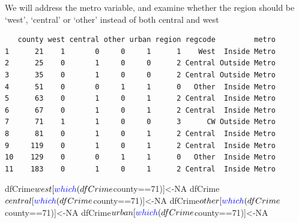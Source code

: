 \documentclass[]{article}
\newenvironment{Shaded}{}{}
\newcommand{\CommentTok}[1]{\textcolor[rgb]{0.00,0.50,0.00}{#1}}
\newcommand{\DecValTok}[1]{#1}
\newcommand{\FloatTok}[1]{#1}
\newcommand{\KeywordTok}[1]{\textcolor[rgb]{0.00,0.00,1.00}{#1}}
\newcommand{\NormalTok}[1]{#1}
\newcommand{\OperatorTok}[1]{#1}
\newcommand{\OtherTok}[1]{\textcolor[rgb]{1.00,0.25,0.00}{#1}}
\newcommand{\StringTok}[1]{\textcolor[rgb]{0.00,0.50,0.50}{#1}}
\begin{document}
We will address the metro variable, and examine whether the region
should be `west', `central' or `other' instead of both central and west

\begin{Shaded}
\end{Shaded}

\begin{verbatim}
   county west central other urban region regcode         metro
1      21    1       0     0     1      1    West  Inside Metro
2      25    0       1     0     0      2 Central Outside Metro
3      35    0       1     0     0      2 Central Outside Metro
4      51    0       0     1     1      0   Other  Inside Metro
5      63    0       1     0     1      2 Central  Inside Metro
6      67    0       1     0     1      2 Central  Inside Metro
7      71    1       1     0     0      3      CW Outside Metro
8      81    0       1     0     1      2 Central  Inside Metro
9     119    0       1     0     1      2 Central  Inside Metro
10    129    0       0     1     1      0   Other  Inside Metro
11    183    0       1     0     1      2 Central  Inside Metro
\end{verbatim}

\begin{Shaded}
\begin{Highlighting}[]
\NormalTok{dfCrime}\OperatorTok{$}\NormalTok{west[}\KeywordTok{which}\NormalTok{(dfCrime}\OperatorTok{$}\NormalTok{county}\OperatorTok{==}\DecValTok{71}\NormalTok{)]<-}\OtherTok{NA}
\NormalTok{dfCrime}\OperatorTok{$}\NormalTok{central[}\KeywordTok{which}\NormalTok{(dfCrime}\OperatorTok{$}\NormalTok{county}\OperatorTok{==}\DecValTok{71}\NormalTok{)]<-}\OtherTok{NA}
\NormalTok{dfCrime}\OperatorTok{$}\NormalTok{other[}\KeywordTok{which}\NormalTok{(dfCrime}\OperatorTok{$}\NormalTok{county}\OperatorTok{==}\DecValTok{71}\NormalTok{)]<-}\OtherTok{NA}
\NormalTok{dfCrime}\OperatorTok{$}\NormalTok{urban[}\KeywordTok{which}\NormalTok{(dfCrime}\OperatorTok{$}\NormalTok{county}\OperatorTok{==}\DecValTok{71}\NormalTok{)]<-}\OtherTok{NA}
\end{Highlighting}
\end{Shaded}
\end{document}
